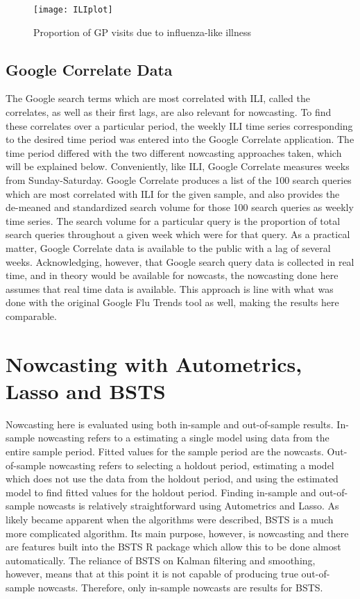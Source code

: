 \begin{figure}[h]
\centering
\texttt{[image: ILIplot]}
\caption{Proportion of GP visits due to influenza-like illness}
\label{fig:ILIplot}
\end{figure}



\subsection{Google Correlate Data}

The Google search terms which are most correlated with ILI, called the correlates, as well as their first lags, are also relevant for nowcasting. To find these correlates over a particular period, the weekly ILI time series corresponding to the desired time period was entered into the Google Correlate application. The time period differed with the two different nowcasting approaches taken, which will be explained below. Conveniently, like ILI, Google Correlate measures weeks from Sunday-Saturday. Google Correlate produces a list of the 100 search queries which are most correlated with ILI for the given sample, and also provides the de-meaned and standardized search volume for those 100 search queries as weekly time series. The search volume for a particular query is the proportion of total search queries throughout a given week which were for that query. As a practical matter, Google Correlate data is available to the public with a lag of several weeks. Acknowledging, however, that Google search query data is collected in real time, and in theory would be available for nowcasts, the nowcasting done here assumes that real time data is available. This approach is line with what was done with the original Google Flu Trends tool as well, making the results here comparable. 

\section{Nowcasting with Autometrics, Lasso and BSTS}

Nowcasting here is evaluated using both in-sample and out-of-sample results. In-sample nowcasting refers to a estimating a single model using data from the entire sample period. Fitted values for the sample period are the nowcasts. Out-of-sample nowcasting refers to selecting a holdout period, estimating a model which does not use the data from the holdout period, and using the estimated model to find fitted values for the holdout period. Finding in-sample and out-of-sample nowcasts is relatively straightforward using Autometrics and Lasso. As likely became apparent when the algorithms were described, BSTS is a much more complicated algorithm. Its main purpose, however, is nowcasting and there are features built into the BSTS R package which allow this to be done almost automatically. The reliance of BSTS on Kalman filtering and smoothing, however, means that at this point it is not capable of producing true out-of-sample nowcasts. Therefore, only in-sample nowcasts are results for BSTS.

